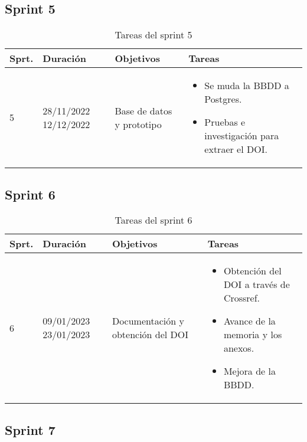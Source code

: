 \subsection{Sprint 5}

\begin{table}[h]
\centering
\begin{tabularx}{\textwidth}{llll}
\toprule
\textbf{Sprt.} & \textbf{Duración} & \textbf{Objetivos} & \textbf{Tareas}\\
\midrule
    5 & \parbox{55}{28/11/2022 12/12/2022} & \parbox{80}{Base de datos y prototipo} & \parbox{150}{\begin{itemize}\item Se muda la BBDD a Postgres. \item Pruebas e investigación para extraer el DOI.\end{itemize}}\\
\bottomrule
\end{tabularx}
\caption{Tareas del sprint 5}
\label{tab:sprint5}
\end{table}


\subsection{Sprint 6}
\begin{table}[h]
\centering
\begin{tabularx}{\textwidth}{llll}
\toprule
\textbf{Sprt.} & \textbf{Duración} & \textbf{Objetivos} & \textbf{Tareas}\\
\midrule
    6 & \parbox{55}{09/01/2023 23/01/2023} & \parbox{80}{Documentación y obtención del DOI} & \parbox{150}{\begin{itemize}\item Obtención del DOI a través de Crossref. \item Avance de la memoria y los anexos. \item Mejora de la BBDD.\end{itemize}}\\
\bottomrule
\end{tabularx}
\caption{Tareas del sprint 6}
\label{tab:sprint6}
\end{table}


\subsection{Sprint 7}

